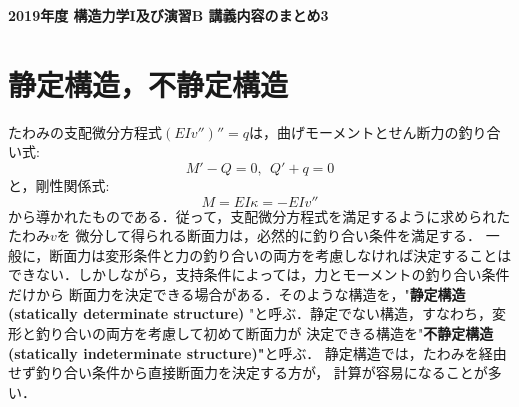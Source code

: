 \documentclass[10pt,a4j]{jarticle}
\newlength{\minitwocolumn}
\begin{document}
\newcommand{\fat}[1]{\mbox{\boldmath $#1$}}
\newcommand{\D}{\partial}
\newcommand{\w}{\omega}
\newcommand{\ga}{\alpha}
\newcommand{\gb}{\beta}
\newcommand{\gx}{\xi}
\newcommand{\gz}{\zeta}
\newcommand{\vhat}[1]{\hat{\fat{#1}}}
\newcommand{\spc}{\vspace{0.7\baselineskip}}
\newcommand{\halfspc}{\vspace{0.3\baselineskip}}

\newcommand{\twofig}[2]
 {
   \begin{figure}
     \begin{minipage}[t]{\minitwocolumn}
         \begin{center}   #1
         \end{center}
     \end{minipage}
         \hspace{\columnsep}
     \begin{minipage}[t]{\minitwocolumn}
         \begin{center} #2
         \end{center}
     \end{minipage}
   \end{figure}
 }
\begin{center}
	{\Large \bf 2019年度 構造力学I及び演習B 講義内容のまとめ3} \\
\end{center}
\section{静定構造，不静定構造}
たわみの支配微分方程式$(EIv'')''=q$は，曲げモーメントとせん断力の釣り合い式:
\begin{equation}
	M'-Q=0, \ \ Q'+q=0 
	\label{eqn:equiv_MQ}
\end{equation}
と，剛性関係式:
\begin{equation}
	M=EI\kappa = -EIv''
	\label{eqn:M_kpp}
\end{equation}
から導かれたものである．従って，支配微分方程式を満足するように求められたたわみ$v$を
微分して得られる断面力は，必然的に釣り合い条件を満足する．
一般に，断面力は変形条件と力の釣り合いの両方を考慮しなければ決定することは
できない．しかしながら，支持条件によっては，力とモーメントの釣り合い条件だけから
断面力を決定できる場合がある．そのような構造を，"{\bf 静定構造(statically determinate structure)
}"と呼ぶ．静定でない構造，すなわち，変形と釣り合いの両方を考慮して初めて断面力が
決定できる構造を"{\bf 不静定構造(statically indeterminate structure)"}と呼ぶ．
静定構造では，たわみを経由せず釣り合い条件から直接断面力を決定する方が，
計算が容易になることが多い．
\end{document}
